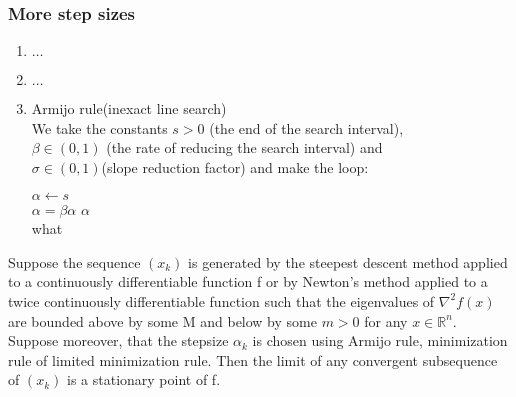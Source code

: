 \subsubsection{More step sizes}

\begin{enumerate}
    \item $\dots$
    \item $\dots$
    \item Armijo rule(inexact line search)\\
        We take the constants $s > 0$ (the end of the search interval),\\
         $\beta \in (0,1)$ (the rate of reducing the search interval) and\\
          $\sigma \in (0,1)$(slope reduction factor) and make the loop:\\
\begin{algorithm}[H]
\SetAlgoLined
\SetNoFillComment
\vspace{3mm}
$\alpha \leftarrow s$\\
 {
    $\alpha = \beta \alpha$
}
\Return $\alpha$\\
\caption{what}
\end{algorithm}




\end{enumerate}

\thm{}
{
    Suppose the sequence $(x_k)$ is generated by the steepest descent method applied to a continuously differentiable function f or by Newton's method applied to a twice continuously differentiable function such that the eigenvalues of  $\nabla^{2} f(x)$ are bounded above by some M and below by some $m > 0$ for any  $x \in \mathbb{R}^{n}$.\\
    Suppose moreover, that the stepsize $\alpha_k$ is chosen using Armijo rule, minimization rule of limited minimization rule. Then the limit of any convergent subsequence of  $(x_k)$ is a stationary point of f.

}


